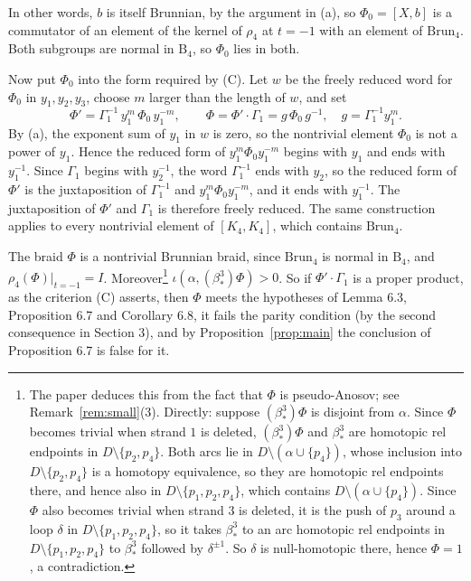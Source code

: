 \documentclass[11pt]{amsart}
\theoremstyle{remark}
\newcommand{\B}{\mathrm{B}}
\newcommand{\Brun}{\mathrm{Brun}}
\newcommand{\bs}{\beta^3_*}
\newcommand{\at}{\big|_{t=-1}}
\begin{document}
In other words, $b$ is itself Brunnian, by the argument in (a), so $\Phi_0=[X,b]$ is a commutator of an element of the kernel of $\rho_4$ at $t=-1$ with an element of $\Brun_4$. Both subgroups are normal in $\B_4$, so $\Phi_0$ lies in both.

Now put $\Phi_0$ into the form required by (C). Let $w$ be the freely reduced word for $\Phi_0$ in $y_1,y_2,y_3$, choose $m$ larger than the length of $w$, and set
\[
\Phi'=\Gamma_1^{-1}\,y_1^{m}\,\Phi_0\,y_1^{-m},\qquad \Phi=\Phi'\cdot\Gamma_1=g\,\Phi_0\,g^{-1},\quad g=\Gamma_1^{-1}y_1^{m}.
\]
By (a), the exponent sum of $y_1$ in $w$ is zero, so the nontrivial element $\Phi_0$ is not a power of $y_1$. Hence the reduced form of $y_1^m\Phi_0y_1^{-m}$ begins with $y_1$ and ends with $y_1^{-1}$. Since $\Gamma_1$ begins with $y_2^{-1}$, the word $\Gamma_1^{-1}$ ends with $y_2$, so the reduced form of $\Phi'$ is the juxtaposition of $\Gamma_1^{-1}$ and $y_1^m\Phi_0y_1^{-m}$, and it ends with $y_1^{-1}$. The juxtaposition of $\Phi'$ and $\Gamma_1$ is therefore freely reduced. The same construction applies to every nontrivial element of $[K_4,K_4]$, which contains $\Brun_4$.

The braid $\Phi$ is a nontrivial Brunnian braid, since $\Brun_4$ is normal in $\B_4$, and $\rho_4(\Phi)\at=I$. Moreover\footnote{The paper deduces this from the fact that $\Phi$ is pseudo-Anosov; see Remark~\ref{rem:small}(3). Directly: suppose $(\bs)\Phi$ is disjoint from $\alpha$. Since $\Phi$ becomes trivial when strand $1$ is deleted, $(\bs)\Phi$ and $\bs$ are homotopic rel endpoints in $D\setminus\{p_2,p_4\}$. Both arcs lie in $D\setminus(\alpha\cup\{p_4\})$, whose inclusion into $D\setminus\{p_2,p_4\}$ is a homotopy equivalence, so they are homotopic rel endpoints there, and hence also in $D\setminus\{p_1,p_2,p_4\}$, which contains $D\setminus(\alpha\cup\{p_4\})$. Since $\Phi$ also becomes trivial when strand $3$ is deleted, it is the push of $p_3$ around a loop $\delta$ in $D\setminus\{p_1,p_2,p_4\}$, so it takes $\bs$ to an arc homotopic rel endpoints in $D\setminus\{p_1,p_2,p_4\}$ to $\bs$ followed by $\delta^{\pm1}$. So $\delta$ is null-homotopic there, hence $\Phi=1$, a contradiction.} $\iota(\alpha,(\bs)\Phi)>0$. So if $\Phi'\cdot\Gamma_1$ is a proper product, as the criterion (C) asserts, then $\Phi$ meets the hypotheses of Lemma 6.3, Proposition 6.7 and Corollary 6.8, it fails the parity condition (by the second consequence in Section 3), and by Proposition~\ref{prop:main} the conclusion of Proposition 6.7 is false for it.
\end{document}

